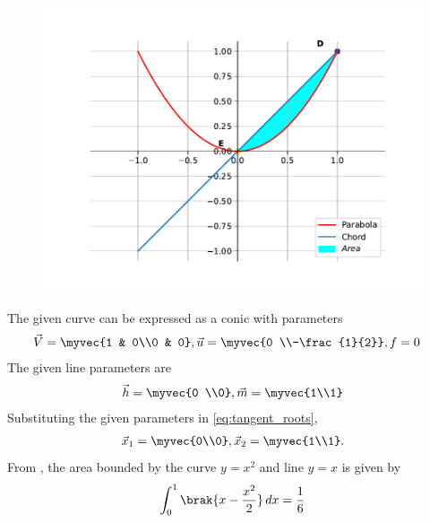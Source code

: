	\begin{figure}[H]
		\centering
 \includegraphics[width=0.75\columnwidth]{chapters/12/8/3/2/figs/fig.pdf}
		\caption{}
		\label{fig:12/8/3/2}
  	\end{figure}
The given curve  can be expressed as a conic with parameters
\begin{align}
	\vec{V} &= \myvec{1 & 0\\0 & 0}, \vec{u} = \myvec{0 \\-\frac{1}{2}}, f = 0
	\end{align}
The given line parameters are
\begin{align}
\vec{h} = \myvec{0 \\0}, \vec{m}=\myvec{1\\1}
\end{align}
Substituting the given parameters in 
\eqref{eq:tangent_roots},
\begin{align}
\vec{x}_1=\myvec{0\\0}, \vec{x}_2=\myvec{1\\1}.
\end{align}
From  
		,
the area bounded by the curve $y=x^2$ and line $y=x$ is given by
\begin{align}
	\int_{0}^{1} \brak{x 
	-\frac{x^2}{2}} \,dx = \frac{1}{6}
\end{align}
